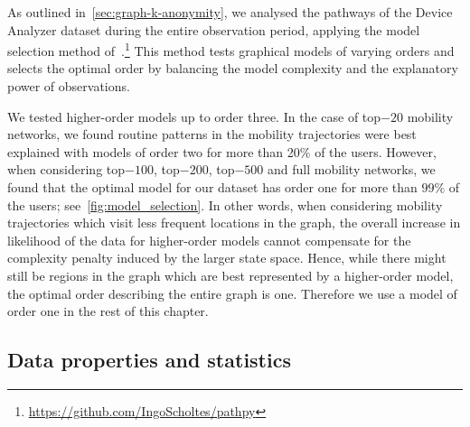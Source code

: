 As outlined in~\cref{sec:graph-k-anonymity}, we analysed the pathways of the Device Analyzer dataset during the entire observation period, applying the model selection method of~\textcite{scholtes2017network}.\footnote{\url{https://github.com/IngoScholtes/pathpy}}
This method tests graphical models of varying orders and selects the optimal order by balancing the model complexity and the explanatory power of observations.

We tested higher-order models up to order three. In the case of top$-20$ mobility networks, we found routine patterns in the mobility trajectories were best explained with models of order two for more than 20$\%$ of the users. However, when considering top$-100$, top$-200$, top$-500$ and full mobility networks, we found that the optimal model for our dataset has order one for more than $ 99\% $ of the users; see~\cref{fig:model_selection}. In other words, when considering mobility trajectories which visit less frequent locations in the graph, the overall increase in likelihood of the data for higher-order models cannot compensate for the complexity penalty induced by the larger state space. Hence, while there might still be regions in the graph which are best represented by a higher-order model, the optimal order describing the entire graph is one. Therefore we use a model of order one in the rest of this chapter.

\subsection{Data properties and statistics} \label{sec:data-stats}

